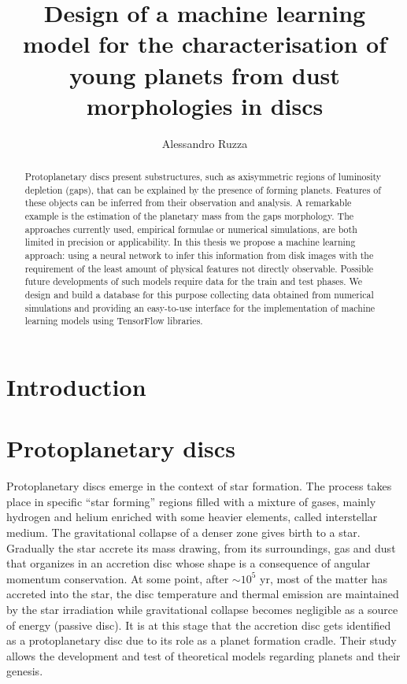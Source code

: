 \documentclass[a4paper,10pt]{report}
\title{Design of a machine learning model for the characterisation of young planets from dust morphologies in discs}
\author{Alessandro Ruzza}
\begin{document}
\maketitle

\begin{abstract}
    Protoplanetary discs present substructures,
    such as axisymmetric regions of luminosity depletion (gaps),
    that can be explained by the presence of forming planets. 
    Features of these objects can be inferred from their
    observation and analysis. A remarkable example is the 
    estimation of the planetary mass from the gaps morphology.
    The approaches currently used, empirical formulae or numerical
    simulations, are both limited in precision or applicability.
    In this thesis we propose a machine learning approach:
    using a neural network to infer this information from 
    disk images with the requirement of the least amount
    of physical features not directly observable.
    Possible future developments of such models require 
    data for the train and test phases.
    We design and build a database for this purpose collecting 
    data obtained from numerical simulations and providing an 
    easy-to-use interface for the implementation of machine learning
    models using TensorFlow libraries.
\end{abstract}

\tableofcontents

\chapter{Introduction}


\chapter{Protoplanetary discs}

Protoplanetary discs emerge in the context of star formation. 
The process takes place in specific ``star forming'' regions filled with a mixture of gases, mainly hydrogen and helium enriched with some
heavier elements, called interstellar medium. The gravitational collapse of a denser zone gives birth to a star. Gradually the star
accrete its mass drawing, from its surroundings, gas and dust that organizes in an accretion disc whose shape is a consequence of angular momentum conservation.
At some point, after $\sim 10^5$ yr, most of the matter has accreted into the star,
the disc temperature and thermal emission are maintained by the star irradiation while gravitational collapse becomes negligible as a source of energy (passive disc). 
It is at this stage that the accretion disc gets identified
as a protoplanetary disc due to its role as a planet formation cradle.
Their study allows the development and test of theoretical models regarding planets and their genesis.
\end{document}
